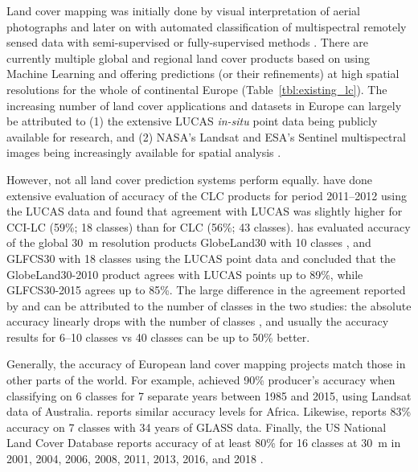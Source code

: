 Land cover mapping was initially done by visual interpretation of aerial photographs and later on with automated classification of multispectral remotely sensed data with semi-supervised or fully-supervised methods \citep{townshend2012global, feranec2016european, liu2021finer}. There are currently multiple global \citep{feng2019global,buchhorn2020copernicus} and regional \citep{homer2007completion,batista2013procedure,pflugmacher2019mapping,malinowski2020,dandrimont2021lucas} land cover products based on using Machine Learning and offering predictions (or their refinements) at high spatial resolutions for the whole of continental Europe (Table\@~\ref{tbl:existing_lc}). The increasing number of land cover applications and datasets in Europe can largely be attributed to (1) the extensive LUCAS \emph{in-situ} point data being publicly available for research, and (2) NASA's Landsat and ESA's Sentinel multispectral images being increasingly available for spatial analysis \citep{szantoi2020addressing,liu2021finer}.
    
However, not all land cover prediction systems perform equally. \citet{vilar2019comparative} have done extensive evaluation of accuracy of the CLC products for period 2011--2012 using the LUCAS data and found that agreement with LUCAS was slightly higher for CCI-LC (59\%; 18 classes) than for CLC (56\%; 43 classes). \citet{gao2020consistency} has evaluated accuracy of the global 30~m resolution products GlobeLand30 with 10 classes \citep{chen2015global}, and GLFCS30 with 18 classes \citep{zhang2020glc_fcs30} using the LUCAS point data and concluded that the GlobeLand30-2010 product agrees with LUCAS points up to 89\%, while GLFCS30-2015 agrees up to 85\%. The large difference in the agreement reported by \citet{vilar2019comparative} and \citet{chen2015global} can be attributed to the number of classes in the two studies: the absolute accuracy linearly drops with the number of classes \citep{herold2008some,van2019does}, and usually the accuracy results for 6--10 classes vs 40 classes can be up to 50\% better. 
    
Generally, the accuracy of European land cover mapping projects match those in other parts of the world. For example, \citet{calderon2021high} achieved 90\% producer's accuracy when classifying on 6 classes for 7 separate years between 1985 and 2015, using Landsat data of Australia. \citet{tsendbazar2018developing} reports similar accuracy levels for Africa. Likewise, \citet{liu2020annual} reports 83\% accuracy on 7 classes with 34 years of GLASS data. Finally, the US National Land Cover Database reports accuracy of at least 80\% for 16 classes at 30~m in 2001, 2004, 2006, 2008, 2011, 2013, 2016, and 2018 \citep{homer2020conterminous}.
    
